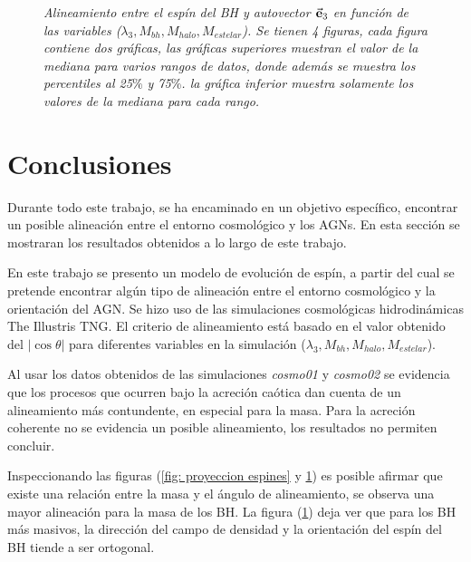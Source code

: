 \begin{figure}
\caption{\emph{Alineamiento entre el espín del BH y autovector $\vec{\bf{e}}_3$ en función de las variables ($\lambda_{3}, M_{bh}, M_{halo}, M_{estelar}$). Se tienen 4 figuras, cada figura contiene dos gráficas, las gráficas superiores muestran el valor de la mediana para varios rangos de datos, donde además se muestra los percentiles al 25$\%$ y 75$\%$. la gráfica inferior muestra solamente los valores de la mediana para cada rango.} }
\label{fig: median dispercion} 
\end{figure}




\newpage
\section{Conclusiones}
\label{sec: conclusiones}
Durante todo este trabajo, se ha encaminado en un objetivo específico, encontrar un posible alineación entre el entorno cosmológico y los AGNs. En esta sección se mostraran los resultados obtenidos a lo largo de este trabajo.


En este trabajo se presento un modelo de evolución de espín, a partir del cual se pretende encontrar algún tipo de alineación entre el entorno cosmológico y la orientación del AGN. Se hizo uso de las simulaciones cosmológicas hidrodinámicas The Illustris TNG. El criterio de alineamiento está basado en el valor obtenido del $|\cos \theta|$ para diferentes variables en la simulación ($\lambda_{3}, M_{bh}, M_{halo}, M_{estelar}$). 

Al usar los datos obtenidos de las simulaciones {\it{cosmo01}} y {\it{cosmo02}} se evidencia que los procesos que ocurren bajo la acreción caótica dan cuenta de un alineamiento más contundente, en especial para la masa. Para la acreción coherente no se evidencia un posible alineamiento, los resultados no permiten concluir. 

Inspeccionando las figuras (\ref{fig: proyeccion espines} y \ref{fig: median dispercion}) es posible afirmar que existe una relación entre la masa y el ángulo de alineamiento, se observa una mayor alineación para la masa de los BH. La figura (\ref{fig: median dispercion}) deja ver que para los BH más masivos, la dirección del campo de densidad y la orientación del espín del BH tiende a ser ortogonal. 

